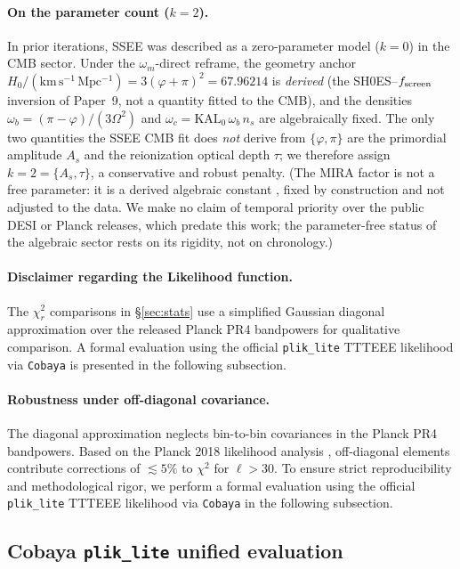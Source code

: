 \documentclass[12pt,a4paper]{article}
\begin{document}
\paragraph{On the parameter count ($k=2$).}
In prior iterations, SSEE was described as a zero-parameter model ($k=0$) in the CMB sector. Under the $\omega_m$-direct reframe, the geometry anchor $H_0/(\mathrm{km\,s^{-1}\,Mpc^{-1}}) = 3(\varphi+\pi)^2 = 67.96214$ is \emph{derived} (the SH0ES--$f_{\rm screen}$ inversion of Paper~9, not a quantity fitted to the CMB), and the densities $\omega_b=(\pi-\varphi)/(3\Omega^2)$ and $\omega_c=\mathrm{KAL}_0\,\omega_b\,n_s$ are algebraically fixed. The only two quantities the SSEE CMB fit does \emph{not} derive from $\{\varphi,\pi\}$ are the primordial amplitude $A_s$ and the reionization optical depth $\tau$; we therefore assign $k=2=\{A_s,\tau\}$, a conservative and robust penalty. (The MIRA factor is not a free parameter: it is a derived algebraic constant \citep{AlmeidaSSEE2026genesis}, fixed by construction and not adjusted to the data. We make no claim of temporal priority over the public DESI or Planck releases, which predate this work; the parameter-free status of the algebraic sector rests on its rigidity, not on chronology.)

\paragraph{Disclaimer regarding the Likelihood function.}
The $\chi^2_r$ comparisons in \S\ref{sec:stats} use a simplified Gaussian diagonal approximation over the released Planck PR4 bandpowers for qualitative comparison. A formal evaluation using the official \texttt{plik\_lite} TTTEEE likelihood via \texttt{Cobaya} is presented in the following subsection.

\paragraph{Robustness under off-diagonal covariance.}
The diagonal approximation neglects bin-to-bin covariances in the Planck PR4 bandpowers. Based on the Planck 2018 likelihood analysis \citep{PlanckLikelihood2020}, off-diagonal elements contribute corrections of $\lesssim5\%$ to $\chi^2$ for $\ell>30$. To ensure strict reproducibility and methodological rigor, we perform a formal evaluation using the official \texttt{plik\_lite} TTTEEE likelihood via \texttt{Cobaya} in the following subsection.

\subsection{Cobaya \texttt{plik\_lite} unified evaluation}
\label{sec:cobaya}
\end{document}
